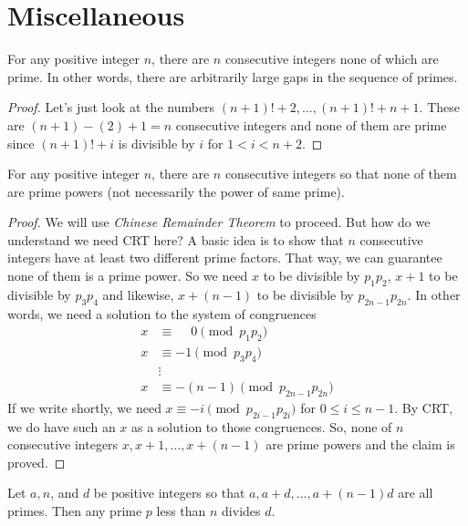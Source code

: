\documentclass{subfiles}
\begin{document}
	\section{Miscellaneous}
	\label{sec:theoremsinprimes}

	\begin{theorem}
		For any positive integer $n$, there are $n$ consecutive integers none of which are prime. In other words, there are arbitrarily large gaps in the sequence of primes.
	\end{theorem}

	\begin{proof}
		Let's just look at the numbers $(n+1)!+2,\ldots,(n+1)!+n+1$. These are $(n+1)-(2)+1=n$ consecutive integers and none of them are prime since $(n+1)!+i$ is divisible by $i$ for $1<i<n+2$.
	\end{proof}

	\begin{theorem}
		For any positive integer $n$, there are $n$ consecutive integers so that none of them are prime powers (not necessarily the power of same prime).
	\end{theorem}

	\begin{proof}
		We will use \textit{Chinese Remainder Theorem} to proceed. But how do we understand we need CRT here? A basic idea is to show that $n$ consecutive integers have at least two different prime factors. That way, we can guarantee none of them is a prime power. So we need $x$ to be divisible by $p_1p_2$, $x+1$ to be divisible by $p_3p_4$ and likewise, $x+(n-1)$ to be divisible by $p_{2n-1}p_{2n}$. In other words, we need a solution to the system of congruences
			\begin{align*}
				x & \equiv \phantom{-} 0  \pmod {p_1p_2}\\
				x & \equiv -1  \pmod{p_3p_4}\\
				  &  \vdots \\
				x & \equiv -(n-1) \pmod{p_{2n-1}p_{2n}}
			\end{align*}
		If we write shortly, we need $x\equiv-i\pmod{p_{2i-1}p_{2i}}$ for $0\leq i\leq n-1$. By CRT, we do have such an $x$ as a solution to those congruences. So, none of $n$ consecutive integers $x, x+1, \ldots, x+(n-1)$ are prime powers and the claim is proved.
	\end{proof}

	\begin{theorem}
		Let $a,n$, and $d$ be positive integers so that $a,a+d,\ldots,a+(n-1)d$ are all primes. Then any prime $p$ less than $n$ divides $d$.
	\end{theorem}
\end{document}
